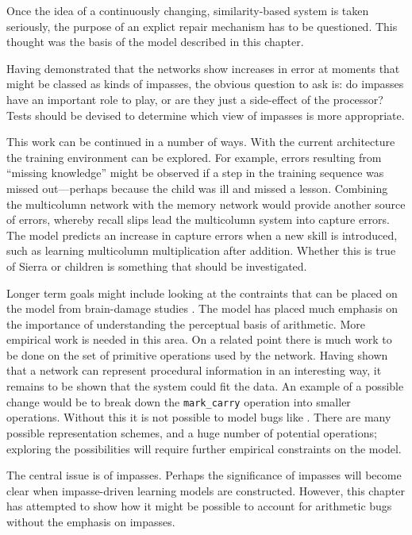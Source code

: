 Once the idea of a continuously changing, similarity-based system is taken
seriously, the purpose of an explict repair mechanism has to be questioned.
This thought was the basis of the model described in this chapter.

Having demonstrated that the networks show increases in error at moments
that might be classed as kinds of impasses, the obvious question to ask is:
do impasses have an important role to play, or are they just a side-effect
of the processor?  Tests should be devised to determine which view of
impasses is more appropriate.

This work can be continued in a number of ways.  With the current
architecture the training environment can be explored. For example, errors
resulting from ``missing knowledge'' might be observed if a step in the
training sequence was missed out---perhaps because the child was ill and
missed a lesson. Combining the multicolumn network with the memory network
would provide
another source of errors, whereby recall slips lead the multicolumn system
into capture errors. The model
predicts an increase in capture errors when a
new skill is introduced, such as learning multicolumn multiplication after
addition.  Whether this is true of Sierra or children is something that
should be investigated.

Longer term goals might include looking at the contraints that can be
placed on the model from brain-damage studies \cite{mcclfact}. The model
has placed much emphasis on the importance of understanding the perceptual
basis of arithmetic.  More empirical work is needed in this area. On a
related point there is much work to be done on the set of primitive
operations used by the network.  Having shown that a network can represent
procedural information in an interesting way, it remains to be shown that
the system could fit the data.  An example of a possible change would be to
break down the \verb|mark_carry| operation into smaller operations. Without
this it is not possible to model bugs like .  There are many
possible representation schemes, and a huge number of potential operations;
exploring the possibilities will require further empirical constraints on
the model.

The central issue is of impasses. Perhaps the significance of impasses will
become clear when impasse-driven learning models are constructed. However,
this chapter has attempted to show how it might be possible to account for
arithmetic bugs without the emphasis on impasses.
